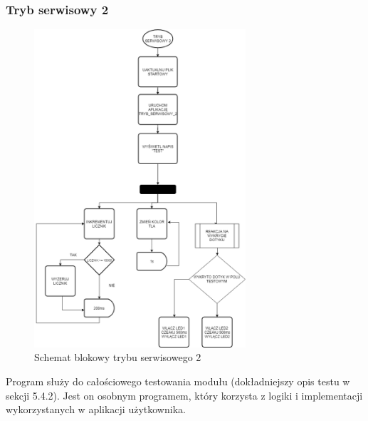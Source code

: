 \documentclass[12pt, eng, twoside, openany, final]{mgr}
\begin{document}
                    \subsubsection{Tryb serwisowy 2}
                        \begin{figure}[H]
                        \begin{center}
                            \includegraphics[width=0.7\textwidth]{t2.png}
                            \caption{Schemat blokowy trybu serwisowego 2} \label{fig:serT2}
                        \end{center}
                        \end{figure}
                        Program służy do całościowego testowania modułu (dokładniejszy opis testu w sekcji 5.4.2). Jest on osobnym programem, który korzysta z logiki i implementacji wykorzystanych w aplikacji użytkownika.
                        
                        \newpage
                        
\end{document}
